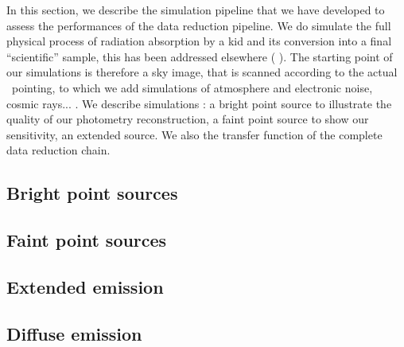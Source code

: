 
In this section, we describe the simulation pipeline that we have developed to
assess the performances of the data reduction pipeline. We do simulate the full
physical process of radiation absorption by a kid and its conversion into a
final ``scientific'' sample, this has been addressed elsewhere
(\cite{xx,xx1,xx2} ). The starting point of our simulations is
therefore a sky image, that is scanned according to the actual \nika~pointing,
to which we add simulations of atmosphere and electronic noise, cosmic
rays... . We describe  simulations : a bright
point source to illustrate the quality of our photometry reconstruction, a faint
point source to show our sensitivity, an extended source. We also the transfer
function of the complete data reduction chain.

\subsection{Bright point sources}

\subsection{Faint point sources}

\subsection{Extended emission}

\subsection{Diffuse emission}


